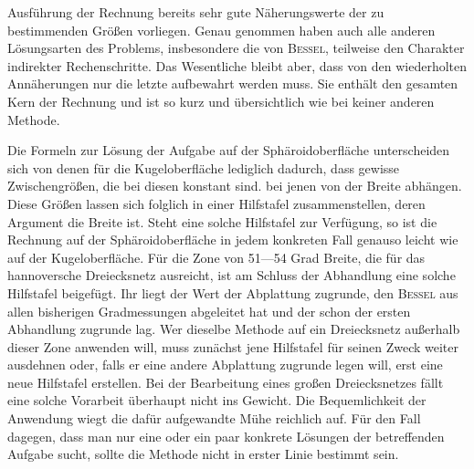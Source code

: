 %
Ausführung der Rechnung bereits sehr gute Näherungswerte der zu bestimmenden Größen vorliegen. Genau genommen haben auch alle anderen Lösungsarten des Problems, insbesondere die von \textsc{Bessel}, teilweise den Charakter indirekter Rechenschritte. Das Wesentliche bleibt aber, dass von den wiederholten Annäherungen nur die letzte aufbewahrt werden muss. Sie enthält den gesamten Kern der Rechnung und ist so kurz und übersichtlich wie bei keiner anderen Methode.

Die Formeln zur Lösung der Aufgabe auf der Sphäroidoberfläche unterscheiden sich von denen für die Kugeloberfläche lediglich dadurch, dass gewisse Zwischengrößen, die bei diesen konstant sind. bei jenen von der Breite abhängen. Diese Größen lassen sich folglich in einer Hilfstafel zusammenstellen, deren Argument die Breite ist. Steht eine solche Hilfstafel zur Verfügung, so ist die Rechnung auf der Sphäroidoberfläche in jedem konkreten Fall genauso leicht wie auf der Kugeloberfläche. Für die Zone von 51---54 Grad Breite, die für das hannoversche Dreiecksnetz ausreicht, ist am Schluss der Abhandlung eine solche Hilfstafel beigefügt. Ihr liegt der Wert der Abplattung zugrunde, den \textsc{Bessel} aus allen bisherigen Gradmessungen abgeleitet hat und der schon der ersten Abhandlung zugrunde lag. Wer dieselbe Methode auf ein Dreiecksnetz außerhalb dieser Zone anwenden will, muss zunächst jene Hilfstafel für seinen Zweck weiter ausdehnen oder, falls er eine andere Abplattung zugrunde legen will, erst eine neue Hilfstafel erstellen. Bei der Bearbeitung eines großen Dreiecksnetzes fällt eine solche Vorarbeit überhaupt nicht ins Gewicht. Die Bequemlichkeit der Anwendung wiegt die dafür aufgewandte Mühe reichlich auf. Für den Fall dagegen, dass man nur eine oder ein paar konkrete Lösungen der betreffenden Aufgabe sucht, sollte die Methode nicht in erster Linie bestimmt sein.
